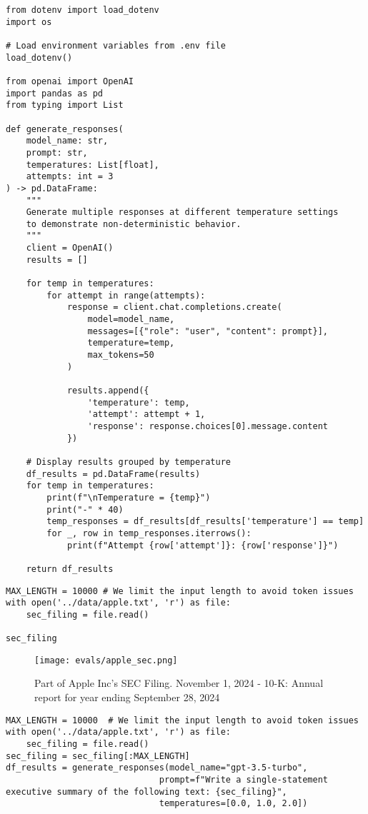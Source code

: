 \begin{verbatim}
from dotenv import load_dotenv
import os

# Load environment variables from .env file
load_dotenv()

from openai import OpenAI
import pandas as pd
from typing import List

def generate_responses(
    model_name: str,
    prompt: str, 
    temperatures: List[float],
    attempts: int = 3
) -> pd.DataFrame:
    """
    Generate multiple responses at different temperature settings
    to demonstrate non-deterministic behavior.
    """
    client = OpenAI()
    results = []
    
    for temp in temperatures:
        for attempt in range(attempts):
            response = client.chat.completions.create(
                model=model_name,
                messages=[{"role": "user", "content": prompt}],
                temperature=temp,
                max_tokens=50
            )
            
            results.append({
                'temperature': temp,
                'attempt': attempt + 1,
                'response': response.choices[0].message.content
            })

    # Display results grouped by temperature 
    df_results = pd.DataFrame(results)
    for temp in temperatures:
        print(f"\nTemperature = {temp}")
        print("-" * 40)
        temp_responses = df_results[df_results['temperature'] == temp]
        for _, row in temp_responses.iterrows():
            print(f"Attempt {row['attempt']}: {row['response']}")
    
    return df_results
\end{verbatim}


\begin{verbatim}
MAX_LENGTH = 10000 # We limit the input length to avoid token issues
with open('../data/apple.txt', 'r') as file:
    sec_filing = file.read()

sec_filing
\end{verbatim}

\begin{figure}[h]
\centering
\texttt{[image: evals/apple\_sec.png]}
\caption{Part of Apple Inc's SEC Filing. November 1, 2024 - 10-K: Annual report for year ending September 28, 2024}
\label{fig:apple-sec-temps}
\end{figure}


\begin{verbatim}
MAX_LENGTH = 10000  # We limit the input length to avoid token issues
with open('../data/apple.txt', 'r') as file:
    sec_filing = file.read()
sec_filing = sec_filing[:MAX_LENGTH]
df_results = generate_responses(model_name="gpt-3.5-turbo",
                              prompt=f"Write a single-statement executive summary of the following text: {sec_filing}",
                              temperatures=[0.0, 1.0, 2.0])
\end{verbatim}

